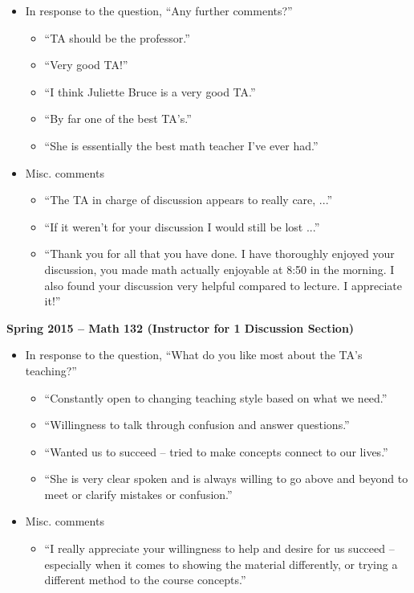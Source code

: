 \documentclass[letterpaper,11pt]{article}
\begin{document}
\begin{itemize}
\item In response to the question, ``Any further comments?''
	\begin{itemize}
	\item ``TA should be the professor.''
	\item ``Very good TA!''
	\item ``I think Juliette Bruce is a very good TA.''
	\item ``By far one of the best TA's.''
	\item ``She is essentially the best math teacher I've ever had.''
	\end{itemize}

\item Misc. comments
	\begin{itemize}
	\item ``The TA in charge of discussion  appears to really care, ...''
	\item ``If it weren't for your discussion I would still be lost ...''
	\item ``Thank you for all that you have done. I have thoroughly enjoyed your discussion, you made math actually enjoyable at 8:50 in the morning. I also found your discussion very helpful compared to lecture. I appreciate it!''
	\end{itemize}
	
	
\end{itemize}

\textbf{Spring 2015 -- Math 132 (Instructor for 1 Discussion Section)} 

\begin{itemize}
\item In response to the question, ``What do you like most about the TA's teaching?''
	\begin{itemize}
	\item ``Constantly open to changing teaching style based on what we need.''
	\item ``Willingness to talk through confusion and answer questions.''
	\item ``Wanted us to succeed -- tried to make concepts connect to our lives.''
	\item ``She is very clear spoken and is always willing to go above and beyond to meet or clarify mistakes or confusion.''
	\end{itemize}

\item Misc. comments
	\begin{itemize}
	\item ``I really appreciate your willingness to help and desire for us succeed -- especially when it comes to showing the material differently, or trying a different method to the course concepts.''
	\end{itemize}
\end{itemize}	
\end{document}
